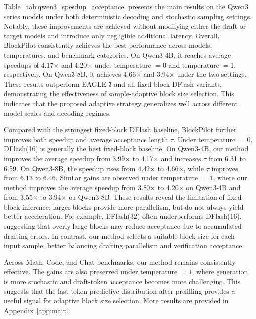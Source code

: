 \documentclass{article}
\begin{document}


Table~\ref{tab:qwen3_speedup_acceptance} presents the main results on the Qwen3 series models under both deterministic decoding and stochastic sampling settings. Notably, these improvements are achieved without modifying either the draft or target models and introduce only negligible additional latency.  Overall, BlockPilot consistently achieves the best performance across models, temperatures, and benchmark categories. On Qwen3-4B, it reaches average speedups of 4.17$\times$ and 4.20$\times$ under temperature $=0$ and temperature $=1$, respectively. On Qwen3-8B, it achieves 4.66$\times$ and 3.94$\times$ under the two settings. These results outperform EAGLE-3 and all fixed-block DFlash variants, demonstrating the effectiveness of sample-adaptive block size selection. This indicates that the proposed adaptive strategy generalizes well across different model scales and decoding regimes.

Compared with the strongest fixed-block DFlash baseline, BlockPilot further improves both speedup and average acceptance length $\tau$. Under temperature $=0$, DFlash(16) is generally the best fixed-block baseline. On Qwen3-4B, our method improves the average speedup from 3.99$\times$ to 4.17$\times$ and increases $\tau$ from 6.31 to 6.59. On Qwen3-8B, the speedup rises from 4.42$\times$ to 4.66$\times$, while $\tau$ improves from 6.13 to 6.46. Similar gains are observed under temperature $=1$, where our method improves the average speedup from 3.80$\times$ to 4.20$\times$ on Qwen3-4B and from 3.55$\times$ to 3.94$\times$ on Qwen3-8B. These results reveal the limitation of fixed-block inference: larger blocks provide more parallelism, but do not always yield better acceleration. For example, DFlash(32) often underperforms DFlash(16), suggesting that overly large blocks may reduce acceptance due to accumulated drafting errors. In contrast, our method selects a suitable block size for each input sample, better balancing drafting parallelism and verification acceptance.

Across Math, Code, and Chat benchmarks, our method remains consistently effective. The gains are also preserved under temperature $=1$, where generation is more stochastic and draft-token acceptance becomes more challenging. This suggests that the last-token predictive distribution after prefilling provides a useful signal for adaptive block size selection. More results are provided in Appendix~\ref{app:main}.
\end{document}
